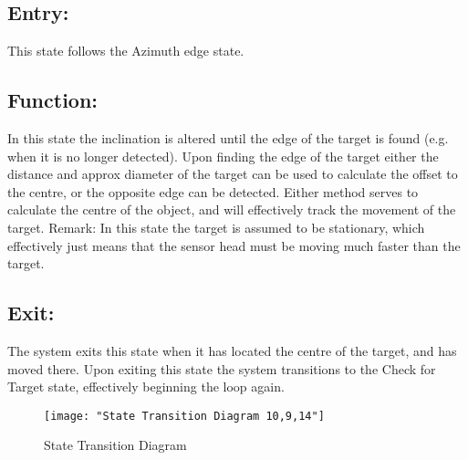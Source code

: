 \documentclass[]{article}
\begin{document}
\subsection{Entry:}
This state follows the Azimuth edge state.

\subsection{Function:}
In this state the inclination is altered until the edge of the target is found (e.g. when it is no longer detected). Upon finding the edge of the target either the distance and approx diameter of the target can be used to calculate the offset to the centre, or the opposite edge can be detected. Either method serves to calculate the centre of the object, and will effectively track the movement of the target.
\newline
Remark: In this state the target is assumed to be stationary, which effectively just means that the sensor head must be moving much faster than the target.

\subsection{Exit:}
The system exits this state when it has located the centre of the target, and has moved there. Upon exiting this state the system transitions to the Check for Target state, effectively beginning the loop again.

\begin{figure}
\centering
\texttt{[image: "State Transition Diagram 10,9,14"]}
\caption{State Transition Diagram}
\label{fig:StateTransitionDiagram10,9,14}
\end{figure}
\end{document}
